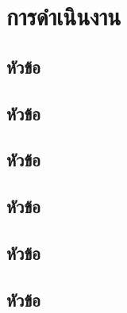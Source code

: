 \chapter{การดําเนินงาน}
\label{chapter3}

\section{หัวข้อ}

\section{หัวข้อ}

\section{หัวข้อ}

\section{หัวข้อ}

\section{หัวข้อ}

\section{หัวข้อ}

